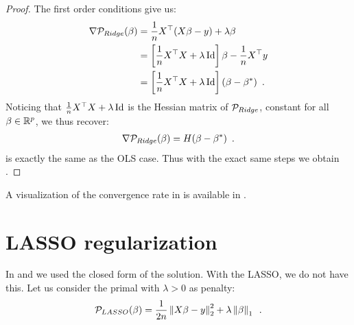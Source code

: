 \documentclass[../main.tex]{subfiles}
\begin{document}
\begin{proof}
    The first order conditions give us:
    \begin{align*}
        \nabla \mathcal{P}_{Ridge}(\beta)
        & = \frac{1}{n}X^\top (X\beta-y)+\lambda \beta \\
        & = \left[\frac{1}{n}X^\top X + \lambda \operatorname{Id}\right]\beta - \frac{1}{n}X^\top y \\
        & = \left[\frac{1}{n}X^\top X + \lambda \operatorname{Id}\right](\beta - \beta^*) \enspace.
    \end{align*}
    Noticing that $\frac{1}{n}X^\top X + \lambda \operatorname{Id}$ is the Hessian matrix of
    $\mathcal{P}_{Ridge}$, constant for all $\beta\in\mathbb{R}^p$, we
    thus recover:
    \begin{align} \label{eq:same_ols}
        \nabla \mathcal{P}_{Ridge}(\beta) = H(\beta - \beta^*)\enspace.
    \end{align}
     is exactly the same as the OLS case. Thus with
    the exact same steps we obtain .
\end{proof}
A visualization of the convergence rate in  is
available in .

\section{LASSO regularization}
\label{sec:LASSO_regularization}

In  and 
we used the closed form of the solution. With the LASSO, we do not have this.
Let us consider the primal with $\lambda>0$ as penalty:
\begin{align}\label{eq:primal_lasso}
\mathcal{P}_{LASSO}(\beta) = \frac{1}{2n} \left \lVert X\beta - y \right \rVert_2 ^2 + \lambda \left \lVert \beta \right \rVert_1
\enspace.
\end{align}
\end{document}

